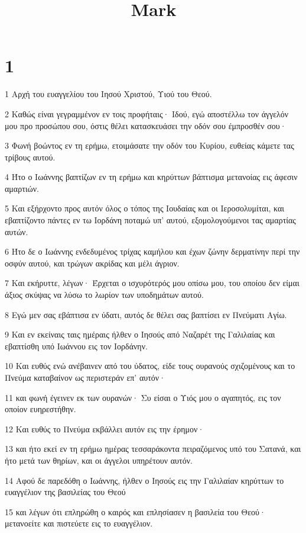 

\title{Mark}


\chapter{1}

\par 1 Αρχή του ευαγγελίου του Ιησού Χριστού, Υιού του Θεού.
\par 2 Καθώς είναι γεγραμμένον εν τοις προφήταις· Ιδού, εγώ αποστέλλω τον άγγελόν μου προ προσώπου σου, όστις θέλει κατασκευάσει την οδόν σου έμπροσθέν σου·
\par 3 Φωνή βοώντος εν τη ερήμω, ετοιμάσατε την οδόν του Κυρίου, ευθείας κάμετε τας τρίβους αυτού.
\par 4 Ήτο ο Ιωάννης βαπτίζων εν τη ερήμω και κηρύττων βάπτισμα μετανοίας εις άφεσιν αμαρτιών.
\par 5 Και εξήρχοντο προς αυτόν όλος ο τόπος της Ιουδαίας και οι Ιεροσολυμίται, και εβαπτίζοντο πάντες εν τω Ιορδάνη ποταμώ υπ' αυτού, εξομολογούμενοι τας αμαρτίας αυτών.
\par 6 Ήτο δε ο Ιωάννης ενδεδυμένος τρίχας καμήλου και έχων ζώνην δερματίνην περί την οσφύν αυτού, και τρώγων ακρίδας και μέλι άγριον.
\par 7 Και εκήρυττε, λέγων· Έρχεται ο ισχυρότερός μου οπίσω μου, του οποίου δεν είμαι άξιος σκύψας να λύσω το λωρίον των υποδημάτων αυτού.
\par 8 Εγώ μεν σας εβάπτισα εν ύδατι, αυτός δε θέλει σας βαπτίσει εν Πνεύματι Αγίω.
\par 9 Και εν εκείναις ταις ημέραις ήλθεν ο Ιησούς από Ναζαρέτ της Γαλιλαίας και εβαπτίσθη υπό Ιωάννου εις τον Ιορδάνην.
\par 10 Και ευθύς ενώ ανέβαινεν από του ύδατος, είδε τους ουρανούς σχιζομένους και το Πνεύμα καταβαίνον ως περιστεράν επ' αυτόν·
\par 11 και φωνή έγεινεν εκ των ουρανών· Συ είσαι ο Υιός μου ο αγαπητός, εις τον οποίον ευηρεστήθην.
\par 12 Και ευθύς το Πνεύμα εκβάλλει αυτόν εις την έρημον·
\par 13 και ήτο εκεί εν τη ερήμω ημέρας τεσσαράκοντα πειραζόμενος υπό του Σατανά, και ήτο μετά των θηρίων, και οι άγγελοι υπηρέτουν αυτόν.
\par 14 Αφού δε παρεδόθη ο Ιωάννης, ήλθεν ο Ιησούς εις την Γαλιλαίαν κηρύττων το ευαγγέλιον της βασιλείας του Θεού
\par 15 και λέγων ότι επληρώθη ο καιρός και επλησίασεν η βασιλεία του Θεού· μετανοείτε και πιστεύετε εις το ευαγγέλιον.
